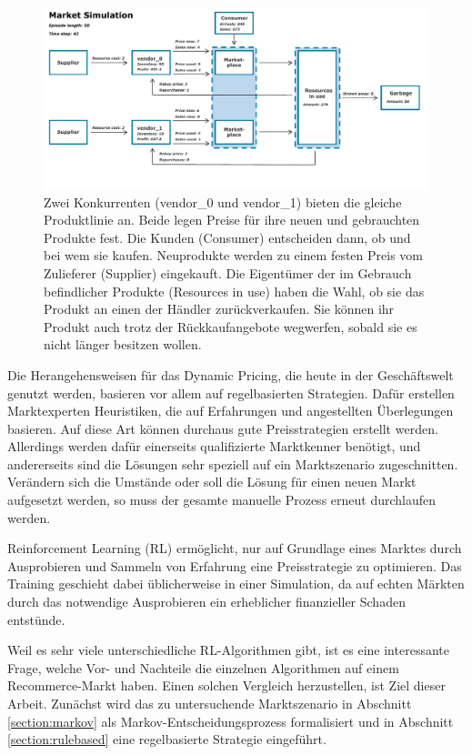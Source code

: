 \begin{figure}[htb]
	\centering
	\includegraphics[width=\textwidth]{introduction/MarketOverview_042.pdf}
	\caption{
		Zwei Konkurrenten (vendor\_0 und vendor\_1) bieten die gleiche Produktlinie an.
		Beide legen Preise für ihre neuen und gebrauchten Produkte fest.
        Die Kunden (Consumer) entscheiden dann, ob und bei wem sie kaufen.
        Neuprodukte werden zu einem festen Preis vom Zulieferer (Supplier) eingekauft.
		Die Eigentümer der im Gebrauch befindlicher Produkte (Resources in use) haben die Wahl, ob sie das Produkt an einen der Händler zurückverkaufen.
        Sie können ihr Produkt auch trotz der Rückkaufangebote wegwerfen, sobald sie es nicht länger besitzen wollen.
	}
	\label{graphic:MarketOverview}
\end{figure}

Die Herangehensweisen für das Dynamic Pricing, die heute in der Geschäftswelt genutzt werden, basieren vor allem auf regelbasierten Strategien.
Dafür erstellen Marktexperten Heuristiken, die auf Erfahrungen und angestellten Überlegungen basieren.
Auf diese Art können durchaus gute Preisstrategien erstellt werden.
Allerdings werden dafür einerseits qualifizierte Marktkenner benötigt, und andererseits sind die Lösungen sehr speziell auf ein Marktszenario zugeschnitten.
Verändern sich die Umstände oder soll die Lösung für einen neuen Markt aufgesetzt werden, so muss der gesamte manuelle Prozess erneut durchlaufen werden.

Reinforcement Learning (RL) ermöglicht, nur auf Grundlage eines Marktes durch Ausprobieren und Sammeln von Erfahrung eine Preisstrategie zu optimieren.
Das Training geschieht dabei üblicherweise in einer Simulation, da auf echten Märkten durch das notwendige Ausprobieren ein erheblicher finanzieller Schaden entstünde.

Weil es sehr viele unterschiedliche RL-Algorithmen gibt, ist es eine interessante Frage, welche Vor- und Nachteile die einzelnen Algorithmen auf einem Recommerce-Markt haben.
Einen solchen Vergleich herzustellen, ist Ziel dieser Arbeit.
Zunächst wird das zu untersuchende Marktszenario in Abschnitt \ref{section:markov} als Markov-Entscheidungsprozess formalisiert und in Abschnitt \ref{section:rulebased} eine regelbasierte Strategie eingeführt.


